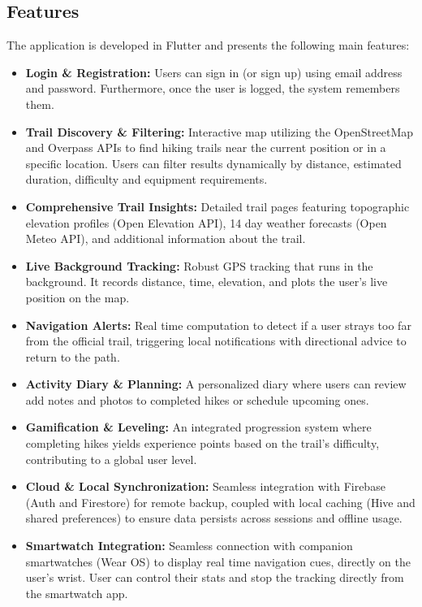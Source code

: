 \documentclass[12pt]{article}
\begin{document}
\subsection{Features}

The application is developed in Flutter and presents the following main features:

\begin{itemize}
    \item\textbf{Login \& Registration:} Users can sign in (or sign up) using email address and password. Furthermore, once the user is logged, the system remembers them. 

    \item \textbf{Trail Discovery \& Filtering:} Interactive map utilizing the OpenStreetMap and Overpass APIs to find hiking trails near the current position or in a specific location. Users can filter results dynamically by distance, estimated duration, difficulty and equipment requirements.
    
    \item \textbf{Comprehensive Trail Insights:} Detailed trail pages featuring topographic elevation profiles (Open Elevation API), 14 day weather forecasts (Open Meteo API), and additional information about the trail.
    
    \item \textbf{Live Background Tracking:} Robust GPS tracking that runs in the background. It records distance, time, elevation, and plots the user's live position on the map.
    
    \item \textbf{Navigation Alerts:} Real time computation to detect if a user strays too far from the official trail, triggering local notifications with directional advice to return to the path.
    
    \item \textbf{Activity Diary \& Planning:} A personalized diary where users can review add notes and photos to completed hikes or schedule upcoming ones.
    
    \item \textbf{Gamification \& Leveling:} An integrated progression system where completing hikes yields experience points based on the trail's difficulty, contributing to a global user level.
    
    \item \textbf{Cloud \& Local Synchronization:} Seamless integration with Firebase (Auth and Firestore) for remote backup, coupled with local caching (Hive and shared preferences) to ensure data persists across sessions and offline usage.
    
    \item \textbf{Smartwatch Integration:} Seamless connection with companion smartwatches (Wear OS) to display real time navigation cues, directly on the user's wrist. User can control their stats and stop the tracking directly from the smartwatch app. 
\end{itemize}
\end{document}
